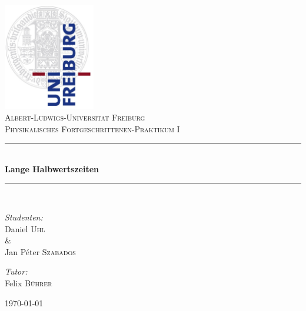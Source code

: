 
\begin{titlepage}

\begin{center}



\includegraphics[width=0.3\textwidth]{Bilder/logo}\\[1.2cm]    

\textsc{\LARGE Albert-Ludwigs-Universit\"at Freiburg}\\[1.75cm]

\textsc{\Large Physikalisches Fortgeschrittenen-Praktikum I}\\[0.75cm]



\newcommand{\HRule}{\rule{\linewidth}{0.5mm}}
\HRule \\[0.5cm]
{ \huge \bfseries Lange Halbwertszeiten}\\[0.5cm]

\HRule \\[1.75cm]


\begin{minipage}{0.4\textwidth}
\begin{flushleft} \large
\emph{Studenten:}\\
Daniel \textsc{Uhl}\\ \setlength{\parindent}{1.25cm} \& 
\setlength{\parindent}{0cm} \\ Jan P\'eter \textsc{Szabados} 
\end{flushleft}
\end{minipage}
\hfill
\begin{minipage}{0.4\textwidth}
\begin{flushright} \large
\emph{Tutor:} \\
Felix \textsc{Bührer}\\
\end{flushright}
\end{minipage}

\vfill


{\large \today}

\end{center}

\end{titlepage}
